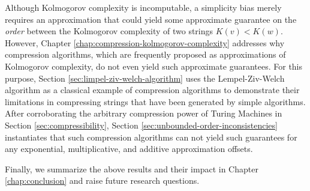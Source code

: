 Although Kolmogorov complexity is incomputable, a simplicity bias merely requires an approximation that could yield some approximate guarantee on the \textit{order} between the Kolmogorov complexity of two strings $K(v)<K(w)$.
However, Chapter \ref{chap:compression-kolmogorov-complexity} addresses why compression algorithms, which are frequently proposed as approximations of Kolmogorov complexity, do not even yield such approximate guarantees.
For this purpose, Section \ref{sec:limpel-ziv-welch-algorithm} uses the Lempel-Ziv-Welch algorithm as a classical example of compression algorithms to demonstrate their limitations in compressing strings that have been generated by simple algorithms.
After corroborating the arbitrary compression power of Turing Machines in Section \ref{sec:compressibility}, Section \ref{sec:unbounded-order-inconsistencies} instantiates that such compression algorithms can not yield such guarantees for any exponential, multiplicative, and additive approximation offsets.

Finally, we summarize the above results and their impact in Chapter \ref{chap:conclusion} and raise future research questions.
